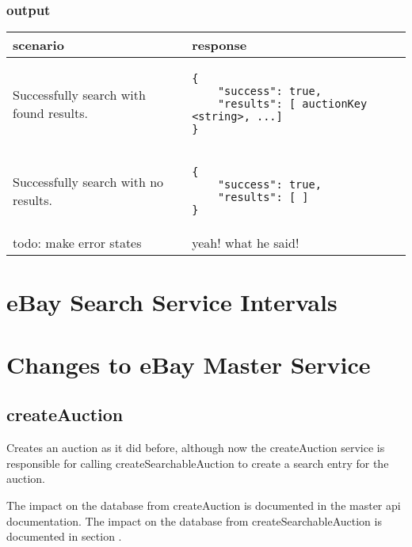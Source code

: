 \documentclass[12pt,a4paper]{article}
\begin{document}
\subsubsection{output}
\begin{center}
    \begin{tabular}{| p{5cm} | l |}
        \hline
        \textbf{scenario} & \textbf{response} \\
        \hline
        Successfully search with found results. &
        \begin{lstlisting}[boxpos=t,language=tablejson,firstnumber=1]
{
    "success": true,
    "results": [ auctionKey <string>, ...]
}
        \end{lstlisting} \\ 
        \hline
 \hline
        Successfully search with no results. &
        \begin{lstlisting}[boxpos=t,language=tablejson,firstnumber=1]
{
    "success": true,
    "results": [ ]
}
        \end{lstlisting} \\ 
        \hline
            todo: make error states & yeah! what he said! \\
        \hline
    \end{tabular}
\end{center}

\section{eBay Search Service Intervals}


\section{Changes to eBay Master Service}

\subsection{createAuction}

Creates an auction as it did before, although now the createAuction service is
responsible for calling createSearchableAuction to create a search entry for
the auction.

The impact on the database from createAuction is documented in the master api
documentation. The impact on the database from createSearchableAuction is
documented in section .
\end{document}
